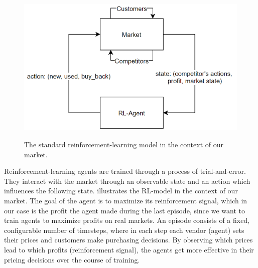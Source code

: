 \begin{figure}
	\centering
	\includegraphics[height = 7 cm]{images/RL-Overview.png}\\[1 ex]
	\caption{The standard reinforcement-learning model in the context of our market.}
	\label{fig:IntroRLDiagram}
\end{figure}

Reinforcement-learning agents are trained through a process of trial-and-error. They interact with the market through an observable state and an action which influences the following state.  illustrates the RL-model in the context of our market. The goal of the agent is to maximize its reinforcement signal, which in our case is the profit the agent made during the last episode, since we want to train agents to maximize profits on real markets. An episode consists of a fixed, configurable number of timesteps, where in each step each vendor (agent) sets their prices and customers make purchasing decisions. By observing which prices lead to which profits (reinforcement signal), the agents get more effective in their pricing decisions over the course of training.
